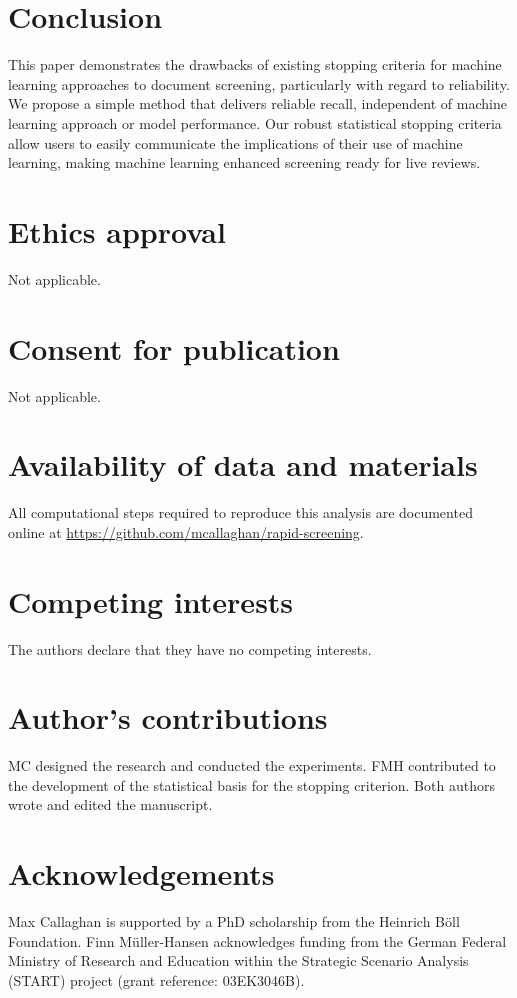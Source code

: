 \documentclass{bmcart}
\begin{document}
	\section*{Conclusion}
	
	This paper demonstrates the drawbacks of existing stopping criteria for machine learning approaches to document screening, particularly with regard to reliability. We propose a simple method that delivers reliable recall, independent of machine learning approach or model performance. Our robust statistical stopping criteria allow users to easily communicate the implications of their use of machine learning, making machine learning enhanced screening ready for live reviews.
	
	
	\begin{backmatter}
		
		\section*{Ethics approval}
		Not applicable.
		
		\section*{Consent for publication}
		Not applicable.
		
		\section*{Availability of data and materials} 
		All computational steps required to reproduce this analysis are documented online at \url{https://github.com/mcallaghan/rapid-screening}.
		
		\section*{Competing interests}
		The authors declare that they have no competing interests.
		
		\section*{Author's contributions}
		MC designed the research and conducted the experiments. FMH contributed to the development of the statistical basis for the stopping criterion. Both authors wrote and edited the manuscript.
		
		\section*{Acknowledgements}
		Max Callaghan is supported by a PhD scholarship from the Heinrich Böll Foundation. Finn M\"{u}ller-Hansen acknowledges funding from the German Federal Ministry of Research and Education within the Strategic Scenario Analysis (START) project (grant reference: 03EK3046B).
		
		
		
		
	\end{backmatter}
\end{document}
